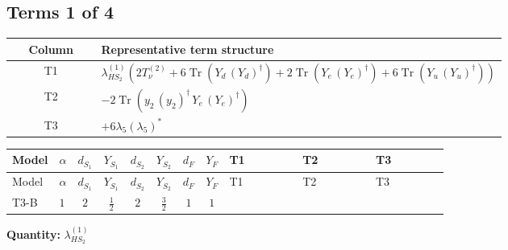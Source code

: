 \documentclass[8pt]{article}
\begin{document}
\begin{landscape}
\subsection*{Terms 1 of 4}
\begin{center}
\begin{tabular}{@{}c >{\raggedright\arraybackslash}p{0.82\linewidth}@{}}
\toprule
Column & Representative term structure \\
\midrule
T1 & \(\displaystyle {\lambda_{HS_2}^{(1)}} (2 T_{\nu}^{(2)}+6 \operatorname{Tr}\!\left({Y_d}\,\left({Y_d}\right)^{\dagger}\right)+2 \operatorname{Tr}\!\left({Y_e}\,\left({Y_e}\right)^{\dagger}\right)+6 \operatorname{Tr}\!\left({Y_u}\,\left({Y_u}\right)^{\dagger}\right))\) \\
\midrule
T2 & \(\displaystyle -2 \operatorname{Tr}\!\left({y_2}\,\left({y_2}\right)^{\dagger}\,{Y_e}\,\left({Y_e}\right)^{\dagger}\right)\) \\
\midrule
T3 & \(\displaystyle +6 {\lambda_5} \left({\lambda_5}\right)^{*}\) \\
\midrule
\bottomrule
\end{tabular}
\end{center}
\smallskip
\tiny
\begin{longtable}{@{}llcccccc >{\raggedright\arraybackslash}p{0.21\linewidth} >{\raggedright\arraybackslash}p{0.21\linewidth} >{\raggedright\arraybackslash}p{0.21\linewidth}@{}}
\toprule
Model & $\alpha$ & $d_{S_1}$ & $Y_{S_1}$ & $d_{S_2}$ & $Y_{S_2}$ & $d_F$ & $Y_F$ & T1 & T2 & T3 \\
\midrule
\endfirsthead
\toprule
Model & $\alpha$ & $d_{S_1}$ & $Y_{S_1}$ & $d_{S_2}$ & $Y_{S_2}$ & $d_F$ & $Y_F$ & T1 & T2 & T3 \\
\midrule
\endhead
T3-B & $1$ & $2$ & $\frac{1}{2}$ & $2$ & $\frac{3}{2}$ & $1$ & $1$ & \scriptsize\adjustbox{max width=\linewidth}{$\begin{gathered} {\lambda_{HS_2}^{(1)}} (2 T_{\nu}^{(2)}+6 \operatorname{Tr}\!\left({Y_d}\,\left({Y_d}\right)^{\dagger}\right)+2 \operatorname{Tr}\!\left({Y_e}\,\left({Y_e}\right)^{\dagger}\right)+6 \operatorname{Tr}\!\left({Y_u}\,\left({Y_u}\right)^{\dagger}\right))\end{gathered}$} & \scriptsize\adjustbox{max width=\linewidth}{$\begin{gathered} -2 \operatorname{Tr}\!\left({y_2}\,\left({y_2}\right)^{\dagger}\,{Y_e}\,\left({Y_e}\right)^{\dagger}\right)\end{gathered}$} & \scriptsize\adjustbox{max width=\linewidth}{$\begin{gathered} +6 {\lambda_5} \left({\lambda_5}\right)^{*}\end{gathered}$} \\
\midrule
\bottomrule
\end{longtable}
\clearpage
\noindent\textbf{Quantity: }$\lambda_{HS_2}^{(1)}$\par\smallskip

\end{landscape}
\end{document}
